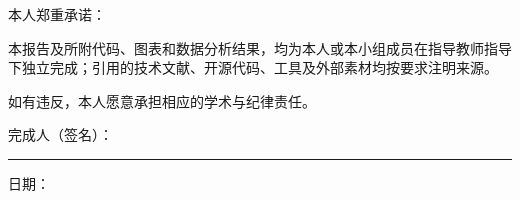 \thispagestyle{empty}
\vspace*{1cm}
\vspace{0.2cm}
{\reportkai\fontsize{17pt}{26pt}\selectfont
\noindent\hspace*{2em}本人郑重承诺：

本报告及所附代码、图表和数据分析结果，均为本人或本小组成员在指导教师指导下独立完成；引用的技术文献、开源代码、工具及外部素材均按要求注明来源。

如有违反，本人愿意承担相应的学术与纪律责任。

\vspace{1.0cm}
\hspace*{4em}完成人（签名）：\rule{6cm}{0.35pt}

\vspace{0.4cm}
\hspace*{7em}日期：\ReportDate
}
